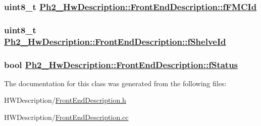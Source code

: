 \hypertarget{class_ph2___hw_description_1_1_front_end_description_4f17ee7ee9d0d395c9f7da5ab3c8f424}{
\subsubsection[fFMCId]{\setlength{\rightskip}{0pt plus 5cm}uint8\_\-t \hyperlink{class_ph2___hw_description_1_1_front_end_description_4f17ee7ee9d0d395c9f7da5ab3c8f424}{Ph2\_\-Hw\-Description::Front\-End\-Description::f\-FMCId}}}
\label{class_ph2___hw_description_1_1_front_end_description_4f17ee7ee9d0d395c9f7da5ab3c8f424}


\hypertarget{class_ph2___hw_description_1_1_front_end_description_7ce5e0acdcb5647bb94f09ec480e8155}{
\subsubsection[fShelveId]{\setlength{\rightskip}{0pt plus 5cm}uint8\_\-t \hyperlink{class_ph2___hw_description_1_1_front_end_description_7ce5e0acdcb5647bb94f09ec480e8155}{Ph2\_\-Hw\-Description::Front\-End\-Description::f\-Shelve\-Id}}}
\label{class_ph2___hw_description_1_1_front_end_description_7ce5e0acdcb5647bb94f09ec480e8155}


\hypertarget{class_ph2___hw_description_1_1_front_end_description_719dce1ef5c6656fd71ae91f6f404053}{
\subsubsection[fStatus]{\setlength{\rightskip}{0pt plus 5cm}bool \hyperlink{class_ph2___hw_description_1_1_front_end_description_719dce1ef5c6656fd71ae91f6f404053}{Ph2\_\-Hw\-Description::Front\-End\-Description::f\-Status}}}
\label{class_ph2___hw_description_1_1_front_end_description_719dce1ef5c6656fd71ae91f6f404053}




The documentation for this class was generated from the following files:\begin{CompactItemize}
\item 
HWDescription/\hyperlink{_front_end_description_8h}{Front\-End\-Description.h}\item 
HWDescription/\hyperlink{_front_end_description_8cc}{Front\-End\-Description.cc}\end{CompactItemize}

